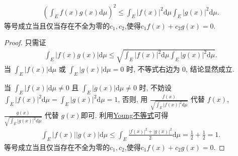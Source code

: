 \documentclass[../../main.tex]{subfiles}
\begin{document}
\begin{theorem}[Cauchy不等式]\label{theorem:Cauchy不等式(一般版本)}
\begin{align*}
\left(\int_E f(x)g(x) \mathrm{d}\mu\right)^2 \leqslant \int_E |f(x)|^2 \mathrm{d}\mu \int_E |g(x)|^2 \mathrm{d}\mu.
\end{align*} 
等号成立当且仅当存在不全为零的$c_1,c_2$,使得$c_1f(x)+c_2g(x)=0.$
\end{theorem}
\begin{proof}
只需证
\begin{align*}
\int_E |f(x)g(x)| \mathrm{d}\mu \leqslant \sqrt{\int_E |f(x)|^2 \mathrm{d}\mu \int_E |g(x)|^2 \mathrm{d}\mu}.
\end{align*}
当 $\int_E |f(x)| \mathrm{d}\mu$ 或 $\int_E |g(x)| \mathrm{d}\mu = 0$ 时, 不等式右边为 $0$, 结论显然成立.

当 $\int_E |f(x)| \mathrm{d}\mu \ne 0$ 且 $\int_E |g(x)| \mathrm{d}\mu \ne 0$ 时, 不妨设 $\int_E |f(x)|^2 \mathrm{d}\mu = \int_E |g(x)|^2 \mathrm{d}\mu = 1$, 否则, 用 $\frac{f(x)}{\sqrt{\int_E |f(x)|^2 \mathrm{d}\mu}}$ 代替 $f(x)$, $\frac{g(x)}{\sqrt{\int_E |g(x)|^2 \mathrm{d}\mu}}$ 代替 $g(x)$即可.
利用\hyperref[theorem:Young不等式初等形式]{Young不等式}可得
\begin{align*}
\int_E |f(x)||g(x)| \mathrm{d}\mu \leqslant \int_E \frac{|f(x)|^2 + |g(x)|^2}{2} \mathrm{d}\mu = \frac{1}{2} + \frac{1}{2} = 1.
\end{align*}
等号成立当且仅当存在不全为零的$c_1,c_2$,使得$c_1f(x)+c_2g(x)=0.$
\end{proof}
\end{document}
